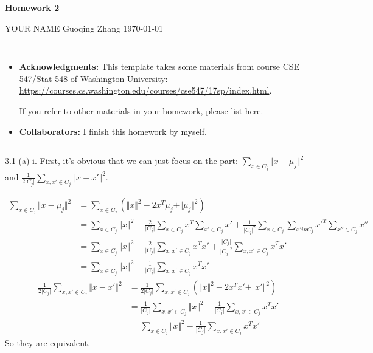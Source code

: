 \documentclass[a4paper]{article}
\begin{document}
\courseheader



\setcounter{hwcnt}{1} %

\begin{center}
  \underline{\bf Homework 2 } \\
\end{center}
\begin{flushleft}
  YOUR NAME Guoqing Zhang\hfill
  \today
\end{flushleft}
\hrule

\vspace{2em}

\flushleft
\rule{\textwidth}{1pt}
\begin{itemize}
\item {\bf Acknowledgments: \/} 
  This template takes some materials from course CSE 547/Stat 548 of Washington University: \small{\url{https://courses.cs.washington.edu/courses/cse547/17sp/index.html}}.

  If you refer to other materials in your homework, please list here.
\item {\bf Collaborators: \/}
  I finish this homework by myself.
\end{itemize}
\rule{\textwidth}{1pt}

\vspace{2em}
3.1 (a) i.
First, it's obvious that we can just focus on the part: $\sum_{x \in C_j} \Vert x - \mu_j\Vert^2$ and $\frac{1}{2\vert C_j \vert} \sum_{x,x'\in C_j}\Vert x - x'\Vert^2$.

$$
\begin{aligned}
\sum_{x \in C_j} \Vert x - \mu_j\Vert^2&= \sum_{x \in C_j} \left(\Vert x\Vert ^2  -2x^T\mu_j +\Vert\mu_j\Vert^2\right)\\
&= \sum_{x \in C_j} \Vert x\Vert^2 - \frac 2{\vert C_j\vert}\sum_{x \in C_j} x^T \sum_{x' \in C_j} x' +\frac{1}{\vert C_j \vert^2}\sum_{x \in C_j}  \sum_{x' in C_j} x'^T \sum_{x'' \in C_j} x''  \\
&= \sum_{x \in C_j} \Vert x\Vert^2  - \frac{2}{\vert C_j\vert} \sum_{x ,x'\in C_j } x^Tx'+ \frac{\vert C_j\vert}{\vert C_j\vert^2} \sum_{x ,x'\in C_j } x^Tx'\\
&= \sum_{x \in C_j} \Vert x\Vert^2  -  \frac{1}{\vert C_j\vert}\sum_{x ,x'\in C_j } x^Tx'
\end{aligned}
$$
$$
\begin{aligned}
\frac{1}{2\vert C_j \vert} \sum_{x,x'\in C_j}\Vert x - x'\Vert^2 &= \frac{1}{2\vert C_j \vert} \sum_{x,x'\in C_j}\left( \Vert x\Vert ^2 - 2x^Tx'+ \Vert x'\Vert^2\right)\\
& = \frac{1}{\vert C_j \vert} \sum_{x,x' \in C_j} \Vert x\Vert^2 - \frac{1}{\vert C_j\vert} \sum_{x,x' \in C_j} x^Tx'\\
&= \sum_{x \in C_j} \Vert x\Vert^2  -  \frac{1}{\vert C_j\vert}\sum_{x ,x'\in C_j } x^Tx'
\end{aligned}
$$
So they are equivalent.
\end{document}
